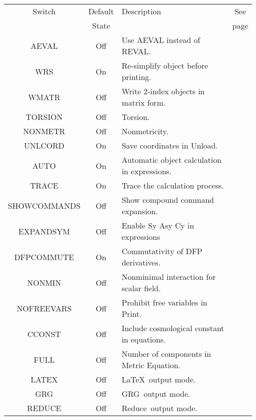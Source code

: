 \documentclass[twoside,openright]{report}
\newcommand{\grgtt}{\ttfamily}
\renewcommand{\tt}{\grgtt}
\newcommand{\grg}{{\sc GRG}}
\newcommand{\reduce}{{\sc Reduce}}
\begin{document}
\begin{tabular}{|c|c|l|c|}
\hline
Switch & Default &\qquad Description  & See \\
       & State &                                & page\\
\hline
\tt  AEVAL          & Off & Use {\tt AEVAL} instead of {\tt REVAL}.  &\pageref{AEVAL}\\
\tt  WRS            & On  & Re-simplify object before printing.      &\pageref{WRS}\\
\tt  WMATR          & Off & Write 2-index objects in matrix form.    &\pageref{WMATR}\\
\tt  TORSION        & Off & Torsion.                                 &\pageref{TORSION}\\
\tt  NONMETR        & Off & Nonmetricity.                            &\pageref{NONMETR}\\
\tt  UNLCORD        & On  & Save coordinates in {\tt Unload}.        &\pageref{UNLCORD}\\
\tt  AUTO           & On  & Automatic object calculation in expressions.      &\pageref{AUTO}\\
\tt  TRACE          & On  & Trace the calculation process.           &\pageref{TRACE}\\
\tt  SHOWCOMMANDS   & Off & Show compound command expansion.         &\pageref{SHOWCOMMANDS}\\
\tt  EXPANDSYM      & Off & Enable {\tt Sy Asy Cy} in expressions    &\pageref{EXPANDSYM}\\
\tt  DFPCOMMUTE     & On  & Commutativity of {\tt DFP} derivatives.              &\pageref{DFPCOMMUTE}\\
\tt  NONMIN         & Off & Nonminimal interaction for scalar field.    &\pageref{NONMIN}\\
\tt  NOFREEVARS     & Off & Prohibit free variables in {\tt Print}.  &\pageref{NOFREEVARS}\\
\tt  CCONST         & Off & Include cosmological constant in equations.     &\pageref{CCONST}\\
\tt  FULL           & Off & Number of components in {\tt Metric Equation}. &\pageref{FULL}\\
\tt  LATEX          & Off &  \LaTeX\ output mode.                    &\pageref{LATEX}\\
\tt  GRG            & Off &  \grg\ output mode.                      &\pageref{GRG}\\
\tt  REDUCE         & Off &  \reduce\ output mode.                   &\pageref{REDUCE}\\

\end{tabular}
\end{document}
